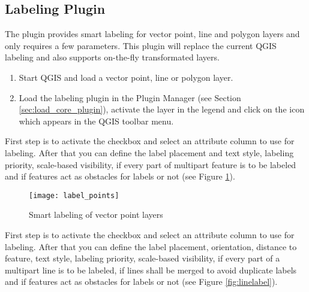 
\subsection{Labeling Plugin}


The  plugin provides smart labeling for vector point, 
line and polygon layers and only requires a few parameters. This plugin will replace 
the current QGIS labeling and also supports on-the-fly transformated layers.

\begin{enumerate}
  \item Start QGIS and load a vector point, line or polygon layer. 
  \item Load the labeling plugin in the Plugin Manager (see Section 
  \ref{sec:load_core_plugin}), activate the layer in the legend and click on the 
   icon which appears in the QGIS toolbar menu.
\end{enumerate}


First step is to activate the  checkbox and select an attribute 
column to use for labeling. After that you can define the label placement and text style, 
labeling priority, scale-based visibility, if every part of multipart feature is to be 
labeled and if features act as obstacles for labels or not (see Figure \ref{fig:pointlabel}).  

\begin{figure}[ht]
\begin{center}
   \caption{Smart labeling of vector point layers \nixcaption}\label{fig:pointlabel}\smallskip
   \texttt{[image: label\_points]}
\end{center}
\end{figure}


First step is to activate the  checkbox and select an attribute
column to use for labeling. After that you can define the label placement, orientation, 
distance to feature, text style, labeling priority, scale-based visibility, if every part 
of a multipart line is to be labeled, if lines shall be merged to avoid duplicate labels 
and if features act as obstacles for labels or not (see Figure \ref{fig:linelabel}).


